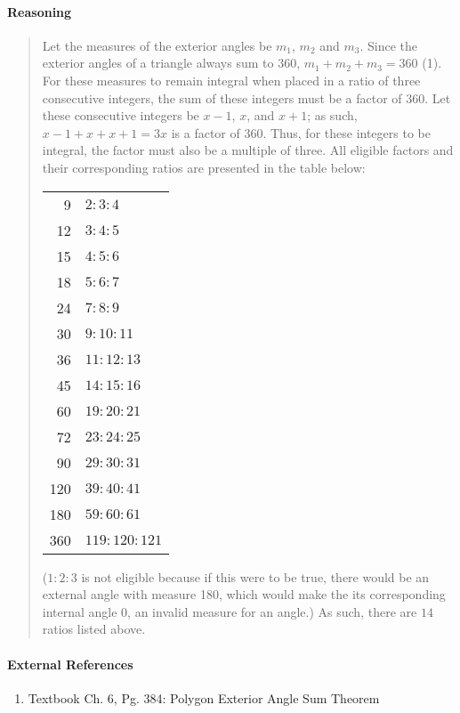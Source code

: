 \documentclass[letterpaper,12pt,twoside]{report}
\begin{document}
	\paragraph{Reasoning}
	\begin{quotation}
		
		Let the measures of the exterior angles be $m_1$, $m_2$ and $m_3$. Since the exterior angles of a triangle always sum to 360\textdegree, $m_1+m_2+m_3=360$ (1). For these measures to remain integral when placed in a ratio of three consecutive integers, the sum of these integers must be a factor of 360. Let these consecutive integers be $x-1$, $x$, and $x+1$; as such, $x-1+x+x+1=3x$ is a factor of 360. Thus, for these integers to be integral, the factor must also be a multiple of three. All eligible factors and their corresponding ratios are presented in the table below:
		
		\begin{center}
			\begin{tabular}{r | l}
				9 & $2:3:4$ \\
				12 & $3:4:5$ \\
				15 & $4:5:6$ \\
				18 & $5:6:7$ \\
				24 & $7:8:9$ \\
				30 & $9:10:11$ \\
				36 & $11:12:13$ \\
				45 & $14:15:16$ \\
				60 & $19:20:21$ \\
				72 & $23:24:25$ \\
				90 & $29:30:31$ \\
				120 & $39:40:41$ \\
				180 & $59:60:61$ \\
				360 & $119:120:121$
			\end{tabular}
		\end{center}
		
		($1:2:3$ is not eligible because if this were to be true, there would be an external angle with measure 180\textdegree, which would make the its corresponding internal angle 0\textdegree, an invalid measure for an angle.) As such, there are $\boxed{14}$ ratios listed above.
	\end{quotation}
	
	\paragraph{External References}
	
	\begin{enumerate}
		\item Textbook Ch. 6, Pg. 384: Polygon Exterior Angle Sum Theorem
	\end{enumerate}
	
\end{document}
